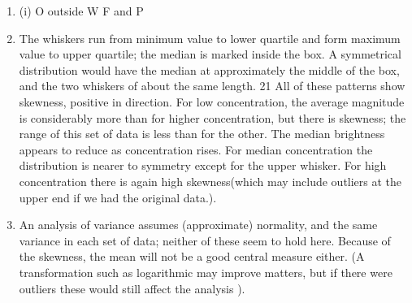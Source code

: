 \documentclass[a4paper,12pt]{article}
\begin{document}
\begin{enumerate}\item  (i)
O outside W F and P
\item The whiskers run from minimum value to lower quartile and form maximum value to
upper quartile; the median is marked inside the box. A symmetrical distribution would
have the median at approximately the middle of the box, and the two whiskers of about
the same length.
21
All of these patterns show skewness, positive in direction. For low concentration, the
average magnitude is considerably more than for higher concentration, but there is
skewness; the range of this set of data is less than for the other. The median brightness
appears to reduce as concentration rises. For median concentration the distribution is
nearer to symmetry except for the upper whisker.
For high concentration there is again high skewness(which may include outliers at the
upper end if we had the original data.).
\item An analysis of variance assumes (approximate) normality, and the same variance
in each set of data; neither of these seem to hold here. Because of the skewness, the
mean will not be a good central measure either.
(A transformation such as logarithmic may improve matters, but if there were outliers
these would still affect the analysis ).\end{enumerate}
\end{document}
